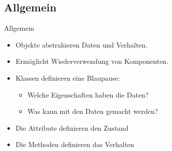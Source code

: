 {\subsection{Allgemein}
\begin{frame}{Allgemein}
   \begin{itemize}[<+(1)->]
      \itemsep14pt
      \item Objekte abstrahieren Daten und Verhalten.
      \item Ermöglicht Wiederverwendung von Komponenten.
      \item Klassen definieren eine Blaupause: \begin{itemize}
         \item Welche Eigenschaften haben die Daten? \hfill {}
         \item Was kann mit den Daten gemacht werden? \hfill {}
      \end{itemize}
      \item Die Attribute definieren den Zustand
      \item Die Methoden definieren das Verhalten
   \end{itemize}
\end{frame}
\SidebarReset

\def\Card#1#2{\begin{tikzpicture}
   \node (udbert) at(0,0) {\bjava{Penguin #1}};
   \node[below right,inner sep=0pt,xshift=4pt,align=left,draw,rounded corners=1pt] at (udbert.south west) {\begin{tabular}{l|p{4em}}
      #2
   \end{tabular}};
\end{tikzpicture}}

}
